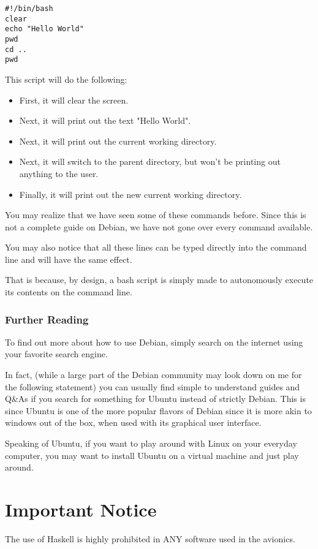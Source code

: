 \documentclass[12pt,article]{memoir}
\begin{document}
\begin{lstlisting}
#!/bin/bash
clear
echo "Hello World"
pwd
cd ..
pwd
\end{lstlisting}
This script will do the following:\par
\begin{itemize}
	\item First, it will clear the screen.
	\item Next, it will print out the text "Hello World".
	\item Next, it will print out the current working directory.
	\item Next, it will switch to the parent directory, but won’t be printing out anything to the user.
	\item Finally, it will print out the new current working directory.
\end{itemize}

You may realize that we have seen some of these commands before. Since this is not a complete guide on Debian, we have not gone over every command available.\par
You may also notice that all these lines can be typed directly into the command line and will have the same effect.\par
That is because, by design, a bash script is simply made to autonomously execute its contents on the command line.\par

\newpage
\subsection{Further Reading}
To find out more about how to use Debian, simply search on the internet using your favorite search engine.\par
In fact, (while a large part of the Debian community may look down on me for the following statement) you can usually find simple to understand guides and Q\&As if you search for something for Ubuntu instead of strictly Debian. This is since Ubuntu is one of the more popular flavors of Debian since it is more akin to windows out of the box, when used with its graphical user interface.\par
Speaking of Ubuntu, if you want to play around with Linux on your everyday computer, you may want to install Ubuntu on a virtual machine and just play around.

\newpage
\chapter{Important Notice}
The use of Haskell is highly prohibited in ANY software used in the avionics.
\end{document}

